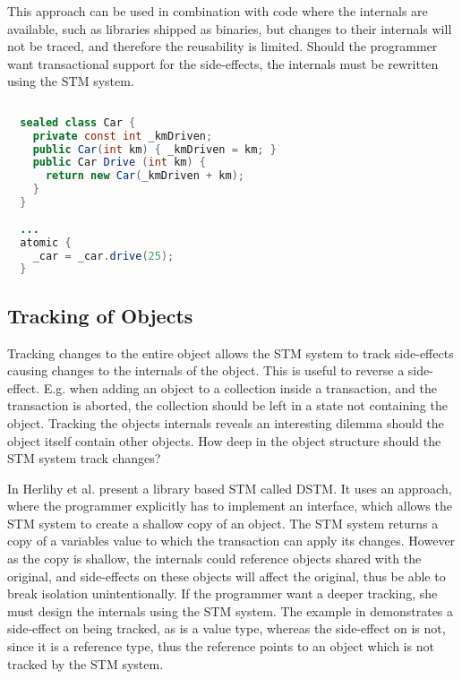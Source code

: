 This approach can be used in combination with code where the internals are available, such as libraries shipped as binaries, but changes to their internals will not be traced, and therefore the reusability is limited. Should the programmer want transactional support for the side-effects, the internals must be rewritten using the \ac{STM} system.

%
\begin{lstlisting}[label=lst:tracking_variable,
  float,
  caption={Tracking Assignment to Variables},
  language=Java,  
  showspaces=false,
  showtabs=false,
  breaklines=true,
  showstringspaces=false,
  breakatwhitespace=true,
  commentstyle=\color{greencomments},
  keywordstyle=\color{bluekeywords},
  stringstyle=\color{redstrings},
  morekeywords={atomic, retry, orElse, var, get, set, sealed}]  % Start your code-block
  
  sealed class Car {
    private const int _kmDriven;
    public Car(int km) { _kmDriven = km; }
    public Car Drive (int km) { 
      return new Car(_kmDriven + km); 
    }
  }
  
  ...
  atomic {
    _car = _car.drive(25);
  }
\end{lstlisting}
%
\subsection{Tracking of Objects}
Tracking changes to the entire object allows the \ac{STM} system to track side-effects causing changes to the internals of the object. This is useful to reverse a side-effect. E.g. when adding an object to a collection inside a transaction, and the transaction is aborted, the collection should be left in a state not containing the object. Tracking the objects internals reveals an interesting dilemma should the object itself contain other objects. How deep in the object structure should the \ac{STM} system track changes? 

In \cite{herlihy2003software} Herlihy et al. present a library based \ac{STM} called \ac{DSTM}. It uses an approach, where the programmer explicitly has to implement an interface, which allows the \ac{STM} system to create a shallow copy of an object. The \ac{STM} system returns a copy of a variables value to which the transaction can apply its changes.  However as the copy is shallow, the internals could reference objects shared with the original, and side-effects on these objects will affect the original, thus be able to break isolation unintentionally. If the programmer want a deeper tracking, she must design the internals using the \ac{STM} system. The example in  demonstrates a side-effect on  being tracked, as  is a value type, whereas the side-effect on  is not, since it is a reference type, thus the reference points to an object which is not tracked by the \ac{STM} system.

